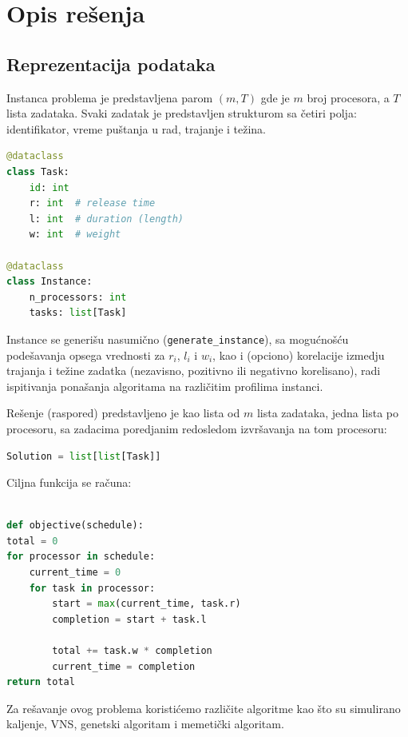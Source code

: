 \documentclass{article}
\begin{document}
\newpage

\section{Opis rešenja}

\subsection{Reprezentacija podataka}

Instanca problema je predstavljena parom $(m, T)$ gde je $m$ broj
procesora, a $T$ lista zadataka. Svaki zadatak je predstavljen strukturom
sa četiri polja: identifikator, vreme puštanja u rad, trajanje i težina.

\begin{lstlisting}[language=Python]
@dataclass
class Task:
    id: int
    r: int  # release time
    l: int  # duration (length)
    w: int  # weight

@dataclass
class Instance:
    n_processors: int
    tasks: list[Task]
\end{lstlisting}

Instance se generišu nasumično (\texttt{generate\_instance}), sa mogućnošću
podešavanja opsega vrednosti za $r_i$, $l_i$ i $w_i$, kao i (opciono)
korelacije izmedju trajanja i težine zadatka (nezavisno, pozitivno ili
negativno korelisano), radi ispitivanja ponašanja algoritama na različitim
profilima instanci.

Rešenje (raspored) predstavljeno je kao lista od $m$ lista zadataka,
jedna lista po procesoru, sa zadacima poredjanim redosledom izvršavanja na
tom procesoru:

\begin{lstlisting}[language=Python]
Solution = list[list[Task]]
\end{lstlisting}

Ciljna funkcija se računa:

\begin{lstlisting}[language=Python]

def objective(schedule):
total = 0
for processor in schedule:
    current_time = 0
    for task in processor:
        start = max(current_time, task.r)
        completion = start + task.l

        total += task.w * completion
        current_time = completion
return total

\end{lstlisting}

Za rešavanje ovog problema koristićemo različite algoritme kao što su 
simulirano kaljenje, VNS, genetski algoritam i memetički algoritam.
\end{document}
